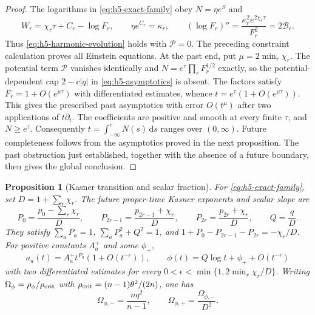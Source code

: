 \documentclass[10pt,a4paper]{article}
\numberwithin{equation}{section}
\newtheorem{proposition}[theorem]{Proposition}
\theoremstyle{definition}
\theoremstyle{remark}
\newcommand{\dd}{\mathrm d}
\begin{document}
\begin{proof}
The logarithms in \eqref{eq:h5-exact-family} obey $N=\eta e^S$ and
\[
 W_r=\chi_r\tau+C_r-\log F_r,\qquad
 \eta e^{C_r}=\kappa_r,\qquad
 (\log F_r)''=
       \frac{\kappa_r^2e^{2\chi_r\tau}}{F_r^2}=2\mathcal B_r.
\]
Thus \eqref{eq:h5-harmonic-evolution} holds with $\mathcal P=0$.
The preceding constraint calculation proves all Einstein equations.
At the past end, put $\mu=2\min_r\chi_r$.
The potential term $\mathcal P$ vanishes identically and
$N=e^\tau\prod_rF_r^{1/2}$ exactly, so the potential-dependent cap
$2-c|q|$ in \eqref{eq:h5-asymptotics} is absent.  The factors satisfy
$F_r=1+O(e^{\mu\tau})$ with differentiated estimates, whence
$t=e^\tau(1+O(e^{\mu\tau}))$.  This gives the prescribed past
asymptotics with error $O(t^\mu)$ after two applications of
$t\partial_t$.  The coefficients are positive and smooth at every
finite $\tau$, and $N\ge e^\tau$.
Consequently $t=\int_{-\infty}^\tau N(s)\,\dd s$ ranges over
$(0,\infty)$.  Future completeness follows from the asymptotics proved
in the next proposition.  The past obstruction just established,
together with the absence of a future boundary, then gives the global
conclusion.
\end{proof}

\begin{proposition}[Kasner transition and scalar fraction]
\label{prop:heisenberg-scattering}
For \eqref{eq:h5-exact-family}, set $D=1+\sum_r\chi_r$.  The future
proper-time Kasner exponents and scalar slope are
\begin{equation}
 P_0=\frac{p_0-\sum_r\chi_r}{D},\qquad
 P_{2r-1}=\frac{p_{2r-1}+\chi_r}{D},\qquad
 P_{2r}=\frac{p_{2r}+\chi_r}{D},\qquad Q=\frac qD.
 \label{eq:heisenberg-scattering}
\end{equation}
They satisfy $\sum_aP_a=1$, $\sum_aP_a^2+Q^2=1$, and
$1+P_0-P_{2r-1}-P_{2r}=-\chi_r/D$.
For positive constants $A_a^+$ and some $\phi_+$,
\begin{equation}
 a_a(t)=A_a^+t^{P_a}(1+O(t^{-\epsilon})),\qquad
 \phi(t)=Q\log t+\phi_++O(t^{-\epsilon})
 \label{eq:heisenberg-future-asymptotics}
\end{equation}
with two differentiated estimates for every
$0<\epsilon<\min\{1,2\min_r\chi_r/D\}$.
Writing $\Omega_\phi=\rho_\phi/\rho_{\rm crit}$ with
$\rho_{\rm crit}=(n-1)\theta^2/(2n)$, one has
\begin{equation}
 \Omega_{\phi,-}=\frac{nq^2}{n-1},\qquad
 \Omega_{\phi,+}=\frac{\Omega_{\phi,-}}{D^2}.
 \label{eq:heisenberg-scalar-scattering}
\end{equation}
\end{proposition}
\end{document}
